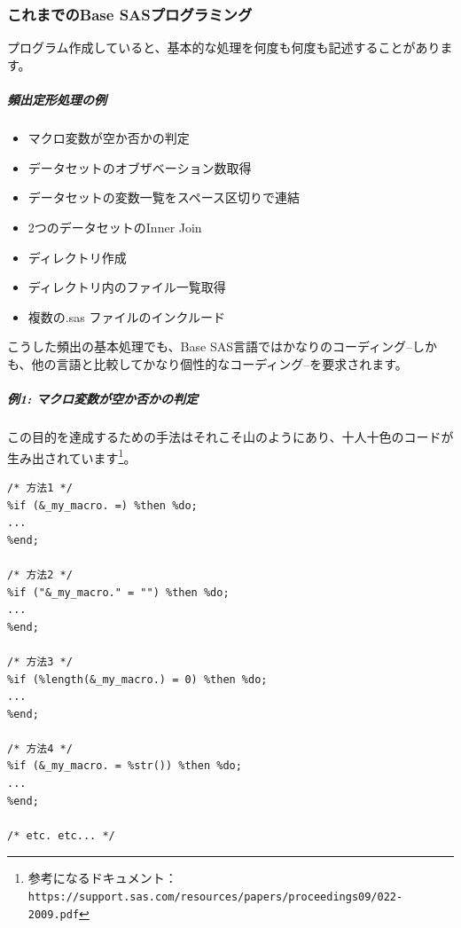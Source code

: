 \chapter{\DocStrTitleWhatIsRDM}
 
\section{\DocStrTitleRDMBackground}
\subsection{これまでのBase SASプログラミング}
プログラム作成していると、基本的な処理を何度も何度も記述することがあります。
\paragraph{頻出定形処理の例}
\begin{itemize}
\item マクロ変数が空か否かの判定
\item データセットのオブザベーション数取得
\item データセットの変数一覧をスペース区切りで連結
\item 2つのデータセットのInner Join
\item ディレクトリ作成
\item ディレクトリ内のファイル一覧取得
\item 複数の.sas ファイルのインクルード
\end{itemize}
 
こうした頻出の基本処理でも、Base SAS言語ではかなりのコーディング--しかも、他の言語と比較してかなり個性的なコーディング--を要求されます。
 
\paragraph{例1: マクロ変数が空か否かの判定}
この目的を達成するための手法はそれこそ山のようにあり、十人十色のコードが生み出されています\footnote{参考になるドキュメント：\texttt{https://support.sas.com/resources/papers/proceedings09/022-2009.pdf}}。
\begin{lstlisting}[language=SAS, caption={マクロ変数が空か否かのチェック}, label={code:is_macro_blank}, breaklines = true]
/* 方法1 */
%if (&_my_macro. =) %then %do;
...
%end;
 
/* 方法2 */
%if ("&_my_macro." = "") %then %do;
...
%end;
 
/* 方法3 */
%if (%length(&_my_macro.) = 0) %then %do;
...
%end;
 
/* 方法4 */
%if (&_my_macro. = %str()) %then %do;
...
%end;
 
/* etc. etc... */
\end{lstlisting}
 
